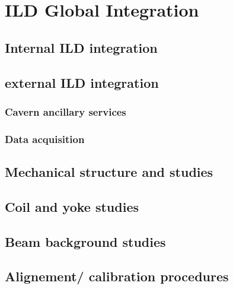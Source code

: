\chapter{ILD Global Integration}

\section{Internal ILD integration}

\section{external ILD integration}

\subsection{Cavern ancillary services}

\subsection{Data acquisition}

\section{Mechanical structure and studies}

\section{Coil and yoke studies}

\section{Beam background studies}

\section{Alignement/ calibration procedures}
